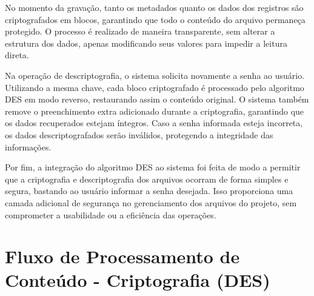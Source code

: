 \documentclass[12pt]{article}
\begin{document}
No momento da gravação, tanto os metadados quanto os dados dos registros são criptografados em blocos, garantindo que todo o conteúdo do arquivo permaneça protegido. O processo é realizado de maneira transparente, sem alterar a estrutura dos dados, apenas modificando seus valores para impedir a leitura direta.

Na operação de descriptografia, o sistema solicita novamente a senha ao usuário. Utilizando a mesma chave, cada bloco criptografado é processado pelo algoritmo DES em modo reverso, restaurando assim o conteúdo original. O sistema também remove o preenchimento extra adicionado durante a criptografia, garantindo que os dados recuperados estejam íntegros. Caso a senha informada esteja incorreta, os dados descriptografados serão inválidos, protegendo a integridade das informações.

Por fim, a integração do algoritmo DES ao sistema foi feita de modo a permitir que a criptografia e descriptografia dos arquivos ocorram de forma simples e segura, bastando ao usuário informar a senha desejada. Isso proporciona uma camada adicional de segurança no gerenciamento dos arquivos do projeto, sem comprometer a usabilidade ou a eficiência das operações.

\section*{Fluxo de Processamento de Conteúdo - Criptografia (DES)} 
\begin{center} 
 \end{center}
\end{document}
